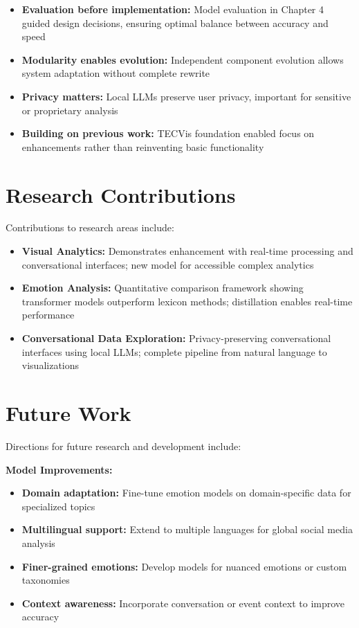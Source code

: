 \begin{itemize}
\item \textbf{Evaluation before implementation:} Model evaluation in Chapter 4 guided design decisions, ensuring optimal balance between accuracy and speed
\item \textbf{Modularity enables evolution:} Independent component evolution allows system adaptation without complete rewrite
\item \textbf{Privacy matters:} Local LLMs preserve user privacy, important for sensitive or proprietary analysis
\item \textbf{Building on previous work:} TECVis foundation enabled focus on enhancements rather than reinventing basic functionality
\end{itemize}


\section{Research Contributions}

Contributions to research areas include:

\begin{itemize}
\item \textbf{Visual Analytics:} Demonstrates enhancement with real-time processing and conversational interfaces; new model for accessible complex analytics
\item \textbf{Emotion Analysis:} Quantitative comparison framework showing transformer models outperform lexicon methods; distillation enables real-time performance
\item \textbf{Conversational Data Exploration:} Privacy-preserving conversational interfaces using local LLMs; complete pipeline from natural language to visualizations
\end{itemize}


\section{Future Work}

Directions for future research and development include:

\textbf{Model Improvements:}
\begin{itemize}
\item \textbf{Domain adaptation:} Fine-tune emotion models on domain-specific data for specialized topics
\item \textbf{Multilingual support:} Extend to multiple languages for global social media analysis
\item \textbf{Finer-grained emotions:} Develop models for nuanced emotions or custom taxonomies
\item \textbf{Context awareness:} Incorporate conversation or event context to improve accuracy
\end{itemize}


